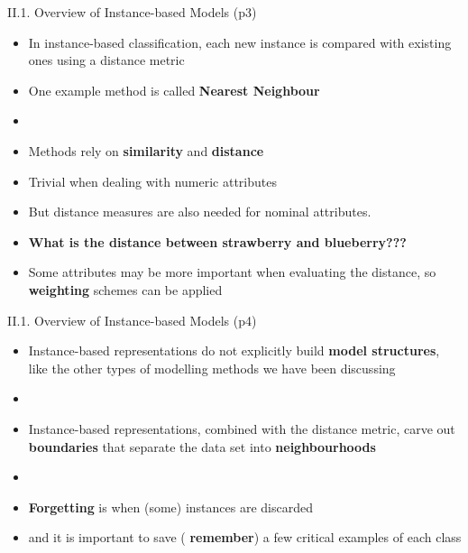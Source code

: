 \documentclass[handout]{beamer}
\newcommand{\strong}[1]{\textbf{\color{teal} #1}}
\newcommand{\stronger}[1]{\textbf{\color{purple} #1}}
\begin{document}
\begin{frame}{II.1. Overview of Instance-based Models (p3)}
\begin{itemize}
\item In instance-based classification, each new instance is compared with existing ones using a distance metric
\item One example method is called \stronger{Nearest Neighbour}
\item[]
\item Methods rely on \strong{similarity} and \strong{distance}
\item Trivial when dealing with numeric attributes
\item But distance measures are also needed for nominal attributes.
\item[] \textbf{What is the distance between {\color{red}strawberry} and {\color{blue}blueberry}???}
\item Some attributes may be more important when evaluating the distance, so \strong{weighting} schemes can be applied
\end{itemize}
\end{frame}
\begin{frame}{II.1. Overview of Instance-based Models (p4)}
\begin{itemize}
\item Instance-based representations do not explicitly build \strong{model structures}, like the other types of modelling methods we have been discussing
\item[]
\item Instance-based representations, combined with the distance metric, carve out \strong{boundaries} that separate the data set into \strong{neighbourhoods}
\item[]
\item \stronger{Forgetting} is when (some) instances are discarded
\item and it is important to save (\strong{remember}) a few critical examples of each class
\end{itemize}
\end{frame}
\end{document}
